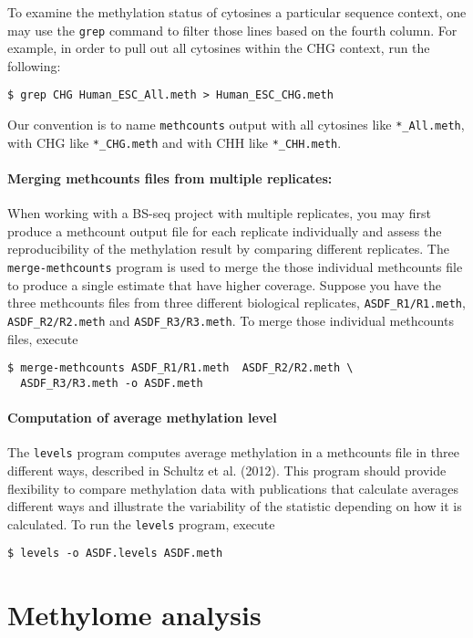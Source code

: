 \documentclass[10pt]{article}
\newcommand{\prog}[1]{\texttt{#1}}
\newcommand{\fn}[1]{\texttt{#1}}
\begin{document}
To examine the methylation status of cytosines a particular sequence
context, one may use the \prog{grep} command to filter those lines
based on the fourth column. For example, in order to pull out all
cytosines within the CHG context, run the following:
\begin{verbatim}
$ grep CHG Human_ESC_All.meth > Human_ESC_CHG.meth
\end{verbatim}
Our convention is to name \prog{methcounts} output with all cytosines
like \fn{*\_All.meth}, with CHG like \fn{*\_CHG.meth} and
with CHH like \fn{*\_CHH.meth}.

\paragraph{Merging methcounts files from multiple replicates:}
\label{sec:merg-methc-file} 
When working with a BS-seq project with multiple replicates, you may
first produce a methcount output file for each replicate individually
and assess the reproducibility of the methylation result by comparing
different replicates. The \prog{merge-methcounts} program is used to
merge the those individual methcounts file to produce a single
estimate that have higher coverage. Suppose you have the three
methcounts files from three different biological replicates,
\fn{ASDF\_R1/R1.meth}, \fn{ASDF\_R2/R2.meth} and
\fn{ASDF\_R3/R3.meth}. To merge those individual methcounts files,
execute
\begin{verbatim}
$ merge-methcounts ASDF_R1/R1.meth  ASDF_R2/R2.meth \
  ASDF_R3/R3.meth -o ASDF.meth
\end{verbatim}

\paragraph{Computation of average methylation level}
The \prog{levels} program computes average methylation in a methcounts
file in three different ways, described in Schultz et al. (2012). This
program should provide flexibility to compare methylation data with
publications that calculate averages different ways and illustrate the
variability of the statistic depending on how it is calculated.  To
run the \prog{levels} program, execute
\begin{verbatim}
$ levels -o ASDF.levels ASDF.meth
\end{verbatim}

\section{Methylome analysis}
\label{sec:high-level-analys}
\end{document}
